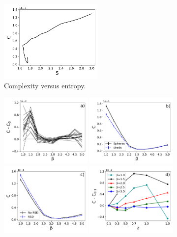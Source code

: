 \documentclass[fleqn,usenatbib]{mnras}
\begin{document}
\begin{figure}
    \centering
    \includegraphics[width=0.45\textwidth]{cvs.pdf}
    \caption{Complexity versus entropy.}
    \label{fig:cvs}
\end{figure}
\begin{figure}
    \centering
    \includegraphics[width=0.4\textwidth]{varianza.pdf}
    \includegraphics[width=0.4\textwidth]{geometria.pdf}
    \includegraphics[width=0.4\textwidth]{rsd.pdf}
    \includegraphics[width=0.4\textwidth]{rsd_evolution.pdf}

\end{figure}
\end{document}
